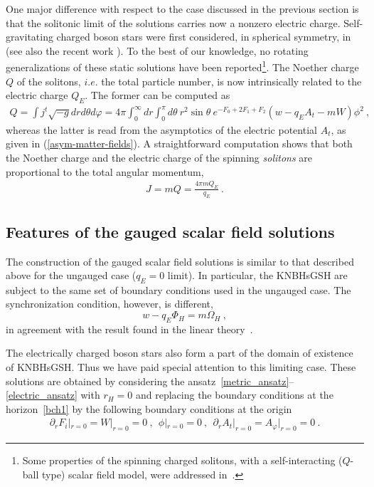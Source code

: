 \documentclass{article}
\begin{document}
One major difference with respect to the case 
discussed in the previous section 
 is that the solitonic limit of the solutions carries now a nonzero electric charge.
Self-gravitating charged boson stars were first considered, in spherical symmetry, in~\cite{Jetzer:1989av} 
(see also the recent work  \cite{Pugliese:2013gsa}). 
To the best of our knowledge, no rotating generalizations of these static solutions have been reported\footnote{ 
Some properties of the spinning charged solitons, 
with a self-interacting ($Q$-ball type) scalar field model, were addressed in~\cite{Brihaye:2009dx}.
}.
The Noether charge $Q$ of the solitons, $i.e.$ the total
particle number, is now intrinsically related to the electric charge $Q_E$. 
The former can be computed as  
%
\begin{eqnarray}
\label{Q1}
Q= \int j^t \sqrt{-g} dr  d\theta d\varphi=
 4\pi \int_{0}^\infty dr \int_0^\pi d\theta  
~r^2\sin \theta ~e^{-F_0+2F_1+F_2}  (w-q_E A_t -mW)\phi^2 \ ,
\end{eqnarray}
%
whereas the latter is read from the asymptotics
 of the electric potential $A_t$, as given in  (\ref{asym-matter-fields}). 
A straightforward computation 
shows that both the Noether charge and the electric charge of the spinning \textit{solitons}
are proportional  to the total angular momentum,
\begin{eqnarray}
\label{JQ}
J= m Q=\frac{4 \pi m Q_E}{q_E}\ .
\end{eqnarray} 


\subsection{Features of the gauged scalar field solutions}
\label{sec_results_g}
 
The construction of the  gauged scalar field solutions is similar 
to that described above for the ungauged case ($q_E=0$ limit).
In particular, the KNBHsGSH are subject to the same set of 
boundary conditions  used in the ungauged case.
The synchronization condition, however, is different,   
\begin{equation}
\label{cond-new}
 w-q_E \Phi_H=m \Omega_H \ ,
\end{equation}
in agreement with the result found in the linear theory~\cite{Hod:2014baa,Benone:2014ssa}.



The electrically charged boson stars also form a part of the domain of existence of KNBHsGSH. 
Thus we have paid special attention to this limiting case.
These solutions  are obtained by considering the ansatz~\eqref{metric_ansatz}--\eqref{electric_ansatz} with $r_H=0$ 
and replacing the boundary conditions at the horizon~\eqref{bch1} 
by the following boundary conditions at the origin
\begin{eqnarray}
\label{bc0} 
\partial_r F_i|_{r=0}= 
W|_{r=0}=0\ ,~~
\phi| _{r =0}=0\ ,~~\partial_r A_t|_{r=0}=A_\varphi|_{r=0}=0\ .
\end{eqnarray}
% 
\end{document}
